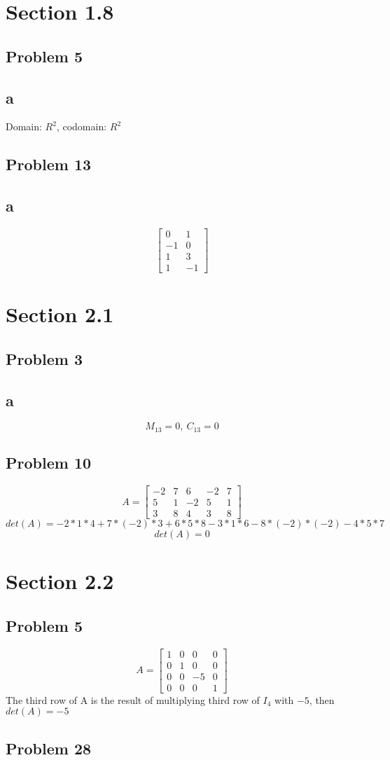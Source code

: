 \documentclass[a4paper,12pt]{report}
\begin{document}
\section*{Section 1.8}
\subsection*{Problem 5}
\subsection*{a}
Domain: \(R^2\), codomain: \(R^2\)
\subsection*{Problem 13}
\subsection*{a}
\[
\begin{bmatrix}
    0  & 1 \\
    -1      & 0 \\
    1 & 3 \\
    1 & -1
\end{bmatrix}
\]
\section*{Section 2.1}
\subsection*{Problem 3}
\subsection*{a}
\[
M_{13}=0,\: C_{13}=0
\]
\subsection*{Problem 10}
\[
A
=
\begin{bmatrix}
    -2  & 7     & 6 & -2 & 7\\
    5      & 1 & -2 & 5      & 1\\
    3 & 8 &  4 & 3 & 8
\end{bmatrix}
\]
\[
det(A)=-2*1*4+7*(-2)*3+6*5*8-3*1*6-8*(-2)*(-2)-4*5*7\]
\[
det(A)=0\]
\section*{Section 2.2}
\subsection*{Problem 5}
\[
A=
\begin{bmatrix}
    1  & 0 & 0 & 0 \\
    0 & 1 & 0 & 0 \\
    0 & 0 & -5 & 0 \\
    0 & 0 & 0 & 1
\end{bmatrix}
\]
The third row of A is the result of multiplying third row of \(I_4\) with \(-5\), then \(det(A)=-5\)
\subsection*{Problem 28}
\begin{thebibliography}{9}

\end{thebibliography}
\end{document}
